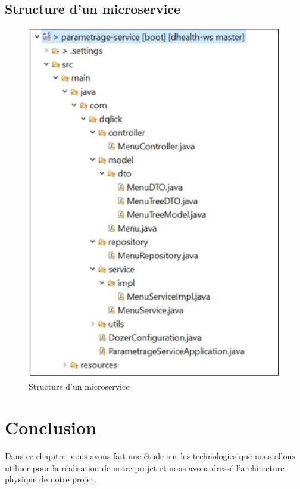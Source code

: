         \subsection{Structure d'un microservice}
                   \begin{figure}[H]
        \centering
        \includegraphics[width=0.8\columnwidth,height=1
\columnwidth]{images/structure.png}
        \caption{Structure d'un microservice}
        \end{figure}
    
  

\section*{Conclusion}
Dans ce chapitre, nous avons fait une étude sur les technologies que nous allons utiliser pour la réalisation de notre projet et nous avons dressé l'architecture physique de notre projet.